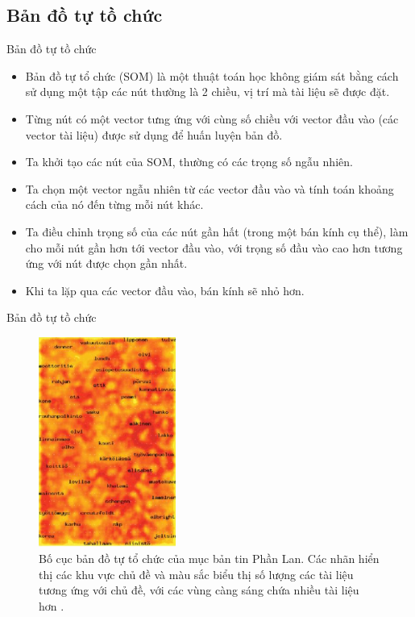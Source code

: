 \documentclass[10pt]{beamer}
\theoremstyle{remark}
\theoremstyle{definition}
\begin{document}
\subsection{Bản đồ tự tồ chức}

\begin{frame}{Bản đồ tự tồ chức}
	\begin{itemize}
		\item Bản đồ tự tổ chức (SOM) \cite{248} là một thuật toán học không giám sát bằng cách sử dụng một tập các nút thường là 2 chiều, vị trí mà tài liệu sẽ được đặt.
		\item Từng nút có một vector tưng ứng với cùng số chiều với vector đầu vào (các vector tài liệu) được sử dụng để huấn luyện bản đồ.
		\item Ta khởi tạo các nút của SOM, thường có các trọng số ngẫu nhiên.
		\item Ta chọn một vector ngẫu nhiên từ các vector đầu vào và tính toán khoảng cách của nó đến từng mỗi nút khác.
		\item Ta điều chỉnh trọng số của các nút gần hất (trong một bán kính cụ thể), làm cho mỗi nút gần hơn tới vector đầu vào,
		với trọng số đầu vào cao hơn tương ứng với nút được chọn gần nhất.
		\item Khi ta lặp qua các vector đầu vào, bán kính sẽ nhỏ hơn.
	\end{itemize}
\end{frame}

\begin{frame}{Bản đồ tự tồ chức}
	\begin{figure}[h!]
        \centering
        \includegraphics[width=0.4\textwidth]{10.png}
        \caption{Bố cục bản đồ tự tổ chức của mục bản tin Phần Lan.
        Các nhãn hiển thị các khu vực chủ đề và màu sắc biểu thị số lượng các tài liệu tương ứng với chủ đề, với các vùng càng sáng chứa nhiều tài liệu hơn \cite{454}.}
        \label{fig:10}
    \end{figure}
\end{frame}
\end{document}
